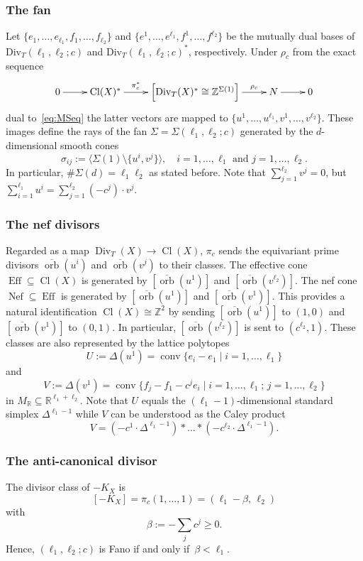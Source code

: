 \documentclass[11pt]{article}
\theoremstyle{definition}
\numberwithin{equation}{section}
\DeclareMathOperator{\orb}{orb}
\DeclareMathOperator{\Nef}{Nef}
\DeclareMathOperator{\Eff}{Eff}
\DeclareMathOperator{\conv}{conv}
\newcommand{\R}{\mathbb R}
\newcommand{\Z}{\mathbb Z}
\newcommand{\Div}{\operatorname{Div}}
\newcommand{\Cl}{\operatorname{Cl}}
\newcommand{\ko}{\overline}
\newcommand{\cc}{{c^{\ell_2}}}
\newcommand{\eN}[1]{e^{#1}}
\newcommand{\fN}[1]{f^{#1}}
\newcommand{\uN}[1]{u^{#1}}
\newcommand{\vN}[1]{v^{#1}}
\newcommand{\eM}[1]{e_{#1}}
\newcommand{\fM}[1]{f_{#1}}
\newcommand{\xb}{\beta}
\newcommand{\kU}{U}
\newcommand{\kV}{V}
\renewcommand{\sharp}{\#}
\begin{document}
\subsubsection{The fan}
\label{pic2:fan}
Let $\{\eM{1},\ldots,\eM{\ell_1},
\fM{1},\ldots,\fM{\ell_2}\}$ and
$\{\eN{1},\ldots,\eN{\ell_1},
\fN{1},\ldots,\fN{\ell_2}\}$ be the mutually dual bases 
of $\mathrm{Div}_T(\ell_1,\ell_2;c)$
and $\mathrm{Div}_T(\ell_1,\ell_2;c)^\ast$, respectively. 
Under $\rho_c$ from the exact sequence
$$
\xymatrix{
0\ar[r]&\Cl(X)^\ast\ar[r]^-{\pi^\ast_c}&
\Big[\mathrm{Div}_T(X)^\ast
\cong\Z^{\Sigma(1)}\Big]\ar[r]^-{\rho_c}&N\ar[r]&0
}
$$
dual to~\eqref{eq:MSeq} the latter vectors are mapped 
to $\{\uN{1},\ldots,\uN{\ell_1},\vN{1},
\ldots,\vN{\ell_2}\}$. These images define the rays 
of the fan $\Sigma=\Sigma (\ell_1,\ell_2;c)$ 
generated by the $d$-dimensional smooth cones 
$$
\sigma_{ij}:=\langle\Sigma(1)\setminus\{\uN{i},\vN{j}\}
\rangle,\quad i=1,\ldots,\ell_1\mbox{ and }j=1,\ldots,
\ell_2.
$$ 
In particular, $\sharp\Sigma(d)=\ell_1\ell_2$ as 
stated before.
{Note that $\sum_{j=1}^{\ell_2}v^j=0$, but
$\sum_{i=1}^{\ell_1}u^i=\sum_{j=1}^{\ell_2}(-c^j)\cdot v^j$.
}

\subsubsection{The nef divisors}
\label{pic2:nef}
Regarded as a map $\Div_T(X)\to\Cl(X)$, 
$\pi_c$ sends the equivariant prime divisors
$\ko{\orb}(\uN{i})$ and $\ko{\orb}(\vN{j})$ 
to their classes. {The effective cone 
$\Eff\subseteq\Cl(X)$ is generated by 
$[\ko{\orb}(\uN{1})]$ and $[\ko{\orb}(\vN{\ell_2})]$. 
The nef cone $\Nef\subseteq\Eff$ is generated 
by $[\ko{\orb}(\uN{1})]$ and 
$[\ko{\orb}(\vN{1})]$. This provides a natural 
identification {$\Cl(X)\cong\Z^2$} by sending 
$[\ko{\orb}(\uN{1})]$ to $(1,0)$ and $[\ko{\orb}(\vN{1})]$ 
to $(0,1)$. In particular, $[\ko{\orb}(\vN{\ell_2})]$ 
is sent to $(\cc,1)$. These classes are also represented 
by the lattice polytopes} 
$$
\kU:=\Delta(\uN{1})=\conv\{\eM{i}-\eM{1}\mid 
i=1,\ldots,\ell_1\}
$$
and 
$$
\kV:=\Delta(\vN{1})=
\conv\{\fM{j}-\fM{1}-c^j\eM{i}\mid
i=1,\ldots,\ell_1;\, j=1,\ldots, \ell_2\}
$$
in $M_\R\subseteq\R^{\ell_1+\ell_2}$. Note 
that $\kU$ equals the $(\ell_1-1)$-dimensional
standard simplex $\Delta^{\ell_1-1}$ while $\kV$ 
can be understood as the Caley product
$$
\kV=(-c^1\cdot \Delta^{\ell_1-1})*\ldots
*(-\cc\cdot \Delta^{\ell_1-1}).
$$

\subsubsection{The anti-canonical divisor}
\label{pic2:can}
The divisor class of $-K_X$ is 
$$
[-K_X]=\pi_c(1,\ldots,1)=(\ell_1-\xb,\,\ell_2)
$$
with 
$$
\xb:=-\sum_j c^j\geq 0.
$$
Hence, $(\ell_1,\ell_2;c)$ is Fano if and 
only if $\,\xb<\ell_1$.
\end{document}
